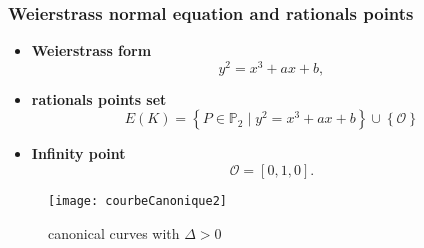 \begin{frame}[t]
    \frametitle{Weierstrass normal equation and rationals points}
    \begin{minipage}[t]{0.48\linewidth}
        
        \begin{itemize}
        \item \textbf{Weierstrass form}
       \[
       y^2=x^3+ax+b
       ,\] 
       \item \textbf{rationals points set}
       \[
    E(K) = \left\{ P \in \mathbb{P}_{2} \mid y^2 = x^3 + ax + b \right\} \cup \left\{
       \mathcal{O} \right\}  
       \] 
       \item \textbf{Infinity point}
       \[
       \mathcal{O} = [0,1,0]
       .\] 
        \end{itemize}

    \end{minipage}%
    \hfill%
    \begin{minipage}[t]{0.48\linewidth}
       \begin{figure}[h]
           \centering
           \texttt{[image: courbeCanonique2]}
           \caption{canonical curves with $\Delta > 0$}
           \label{fig:courbeCanonique2}
       \end{figure} 
    \end{minipage}
\end{frame}
